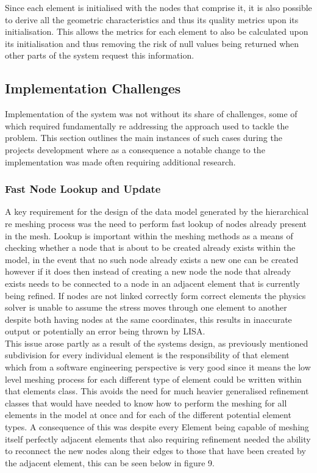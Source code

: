 \noindent
Since each element is initialised with the nodes that comprise it, it is also possible to derive all the geometric characteristics and thus its quality metrics upon its initialisation. This allows the metrics for each element to also be calculated upon its initialisation and thus removing the risk of null values being returned when other parts of the system request this information.




\subsection{Implementation Challenges}
Implementation of the system was not without its share of challenges, some of which required fundamentally re addressing the approach used to tackle the problem. This section outlines the main instances of such cases during the projects development where as a consequence a notable change to the implementation was made often requiring additional research.

\subsubsection{Fast Node Lookup and Update}
A key requirement for the design of the data model generated by the hierarchical re meshing process was the need to perform fast lookup of nodes already present in the mesh. Lookup is important within the meshing methods as a means of checking whether a node that is about to be created already exists within the model, in the event that no such node already exists a new one can be created however if it does then instead of creating a new node the node that already exists needs to be connected to a node in an adjacent element that is currently being refined. If nodes are not linked correctly form correct elements the physics solver is unable to assume the stress moves through one element to another despite both having nodes at the same coordinates, this results in inaccurate output or potentially an error being thrown by LISA. \\ 

\noindent
This issue arose partly as a result of the systems design, as previously mentioned subdivision for every individual element is the responsibility of that element which from a software engineering perspective is very good since it means the low level meshing process for each different type of element could be written within that elements class. This avoids the need for much heavier generalised refinement classes that would have needed to know how to perform the meshing for all elements in the model at once and for each of the different potential element types. A consequence of this was despite every Element being capable of meshing itself perfectly adjacent elements that also requiring refinement needed the ability to reconnect the new nodes along their edges to those that have been created by the adjacent element, this can be seen below in figure 9. \\ 


